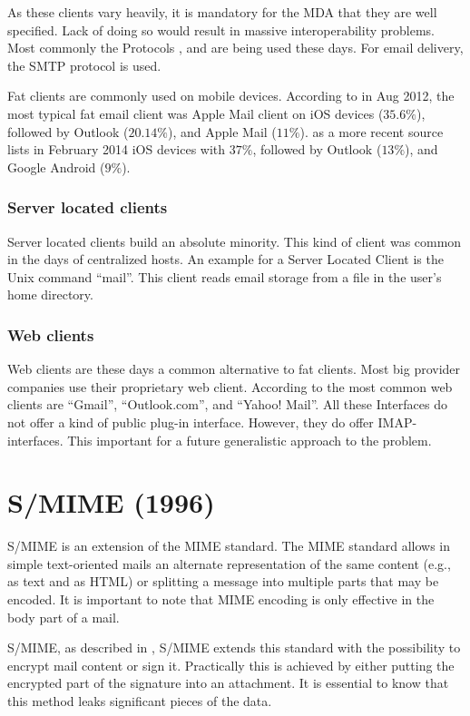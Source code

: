 As these clients vary heavily, it is mandatory for the MDA that they are well specified. Lack of doing so would result in massive interoperability problems. Most commonly the Protocols ,  and  are being used these days. For email delivery, the SMTP protocol is used. 

Fat clients are commonly used on mobile devices. According to  \cite{clientDistribution} in Aug 2012, the most typical fat email client was Apple Mail client on iOS devices ($35.6\%$), followed by Outlook ($20.14\%$), and Apple Mail ($11\%$). \cite{clientDistribution2} as a more recent source lists in February 2014 iOS devices with $37\%$, followed by Outlook ($13\%$), and  Google Android ($9\%$).

\subsubsection*{Server located clients}
Server located clients build an absolute minority. This kind of client was common in the days of centralized hosts. An example for a Server Located Client is the Unix command ``mail''. This client reads email storage from a file in the user's home directory.

\subsubsection*{Web clients}
Web clients are these days a common alternative to fat clients. Most big provider companies use their proprietary web client. According to \cite{clientDistribution2} the most common web clients are "`Gmail"', "`Outlook.com"', and "`Yahoo! Mail"'. All these Interfaces do not offer a kind of public plug-in interface. However,  they do offer IMAP-interfaces. This important for a future generalistic approach to the problem.

\section*{S/MIME (1996)}
S/MIME is an extension of the MIME standard. The MIME standard allows in simple text-oriented mails an alternate representation of the same content (e.g., as text and as HTML) or splitting a message into multiple parts that may be encoded. It is important to note that MIME encoding is only effective in the body part of a mail.

S/MIME, as described in \cite{rfc3851}, S/MIME extends this standard with the possibility to encrypt mail content or sign it. Practically this is achieved by either putting the encrypted part of the signature into an attachment. It is essential to know that this method leaks significant pieces of the data.

